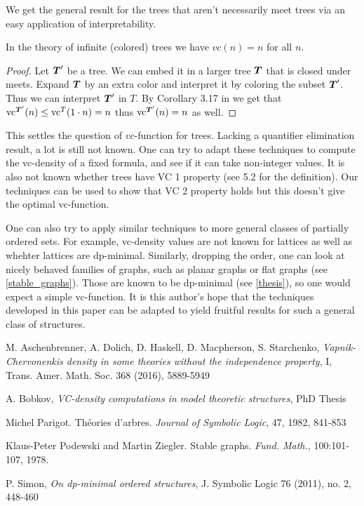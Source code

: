 \documentclass{amsart}
\DeclareMathOperator{\TT}{\boldface T}
\begin{document}
We get the general result for the trees that aren't necessarily meet trees via an easy application of interpretability.
\begin{Corollary}
  In the theory of infinite (colored) trees we have $vc(n) = n$ for all $n$.
\end{Corollary}
\begin{proof}
  Let $\TT'$ be a tree. We can embed it in a larger tree $\TT$ that is closed under meets. Expand $\TT$ by an extra color and interpret it by coloring the subset $\TT'$. Thus we can interpret $\TT'$ in $T$. By Corollary 3.17 in \cite{density} we get that $\vc^{\TT'}(n) \leq \vc^T(1 \cdot n) = n$ thus $\vc^{\TT'}(n) = n$ as well.
\end{proof}

This settles the question of $vc$-function for trees. Lacking a quantifier elimination result, a lot is still not known.
One can try to adapt these techniques to compute the vc-density of a fixed formula, and see if it can take non-integer values.
It is also not known whether trees have VC 1 property (see \cite{density} 5.2 for the definition).
Our techniques can be used to show that VC 2 property holds but this doesn't give the optimal vc-function.

One can also try to apply similar techniques to more general classes of partially ordered sets.
For example, vc-density values are not known for lattices as well as whehter lattices are dp-minimal.
Similarly, dropping the order, one can look at nicely behaved families of graphs, such as planar graphs or flat graphs (see \ref{stable_graphs}).
Those are known to be dp-minimal (see \ref{thesis}), so one would expect a simple vc-function.
It is this author's hope that the techniques developed in this paper can be adapted to yield fruitful results for such a general class of structures.

\begin{thebibliography}{9}

  M. Aschenbrenner, A. Dolich, D. Haskell, D. Macpherson, S. Starchenko,
  \textit{Vapnik-Chervonenkis density in some theories without the independence property}, I,
  Trans. Amer. Math. Soc. 368 (2016), 5889-5949

 A. Bobkov, \textit{VC-density computations in model theoretic structures}, PhD Thesis

  Michel Parigot.
  Th\'eories d'arbres.
  \textit{Journal of Symbolic Logic}, 47, 1982, 841-853

  Klaus-Peter Podewski and Martin Ziegler. Stable graphs. \textit{Fund. Math.}, 100:101-107, 1978.
  
  P. Simon,
  \textit{On dp-minimal ordered structures},
  J. Symbolic Logic 76 (2011), no. 2, 448-460
  
\end{thebibliography}
\end{document}
